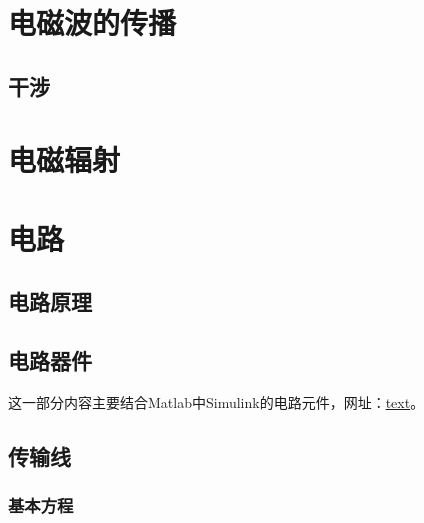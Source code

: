\section{电磁波的传播}
\subsection{干涉}

\section{电磁辐射}


\section{电路}
\subsection{电路原理}


\subsection{电路器件}
这一部分内容主要结合Matlab中Simulink的电路元件，网址：\href{}{text}。

\subsection{传输线}
\subsubsection{基本方程}


